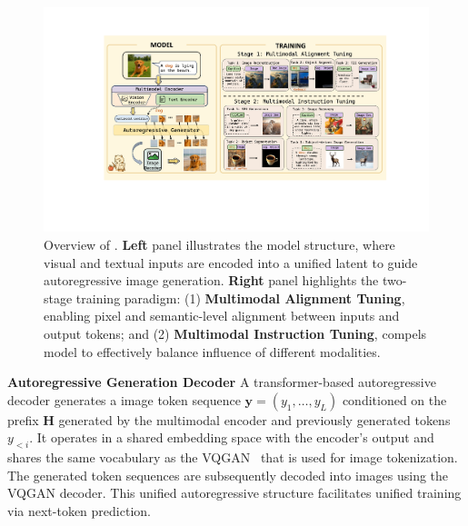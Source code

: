 \begin{figure}[t]
\centering
\vspace{-8ex}
\includegraphics[width=1.0\textwidth]{figures/model_stagev2.pdf}
\caption{Overview of \model. \textbf{Left} panel illustrates the model structure, where visual and textual inputs are encoded into a unified latent to guide autoregressive image generation. \textbf{Right} panel highlights the two-stage training paradigm: (1) \textbf{Multimodal Alignment Tuning}, enabling pixel and semantic-level alignment between inputs and output tokens; and (2) \textbf{Multimodal Instruction Tuning}, compels model to effectively balance influence of different modalities.}
\label{fig:structure}
\vspace{-3ex}
\end{figure}
\textbf{Autoregressive Generation Decoder}
A transformer-based autoregressive decoder generates a image token sequence $\mathbf{y} = (y_1, \dots, y_{L})$ conditioned on the prefix $\mathbf{H}$ generated by the multimodal encoder and previously generated tokens $y_{<i}$. It operates in a shared embedding space with the encoder's output and shares the same vocabulary as the VQGAN~\citep{Esser2020TamingTF} that is used for image tokenization.
The generated token sequences are subsequently decoded into images using the VQGAN decoder. This unified autoregressive structure facilitates unified training via next-token prediction.

